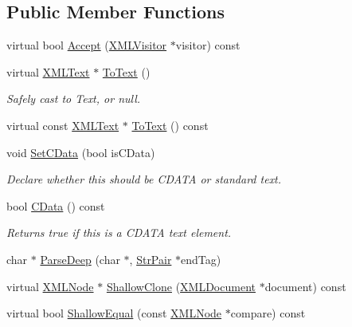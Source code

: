 \subsection*{Public Member Functions}
\begin{DoxyCompactItemize}
\item 
virtual bool \hyperlink{classtinyxml2_1_1_x_m_l_text_ae659d4fc7351a7df11c111cbe1ade46f}{Accept} (\hyperlink{classtinyxml2_1_1_x_m_l_visitor}{X\-M\-L\-Visitor} $\ast$visitor) const 
\item 
virtual \hyperlink{classtinyxml2_1_1_x_m_l_text}{X\-M\-L\-Text} $\ast$ \hyperlink{classtinyxml2_1_1_x_m_l_text_ab1213b4ddebe9b17ec7e7040e9f1caf7}{To\-Text} ()
\begin{DoxyCompactList}\small\item\em Safely cast to Text, or null. \end{DoxyCompactList}\item 
virtual const \hyperlink{classtinyxml2_1_1_x_m_l_text}{X\-M\-L\-Text} $\ast$ \hyperlink{classtinyxml2_1_1_x_m_l_text_a1e53cbc60968fe966790a65eaf87baaa}{To\-Text} () const 
\item 
void \hyperlink{classtinyxml2_1_1_x_m_l_text_ad080357d76ab7cc59d7651249949329d}{Set\-C\-Data} (bool is\-C\-Data)
\begin{DoxyCompactList}\small\item\em Declare whether this should be C\-D\-A\-T\-A or standard text. \end{DoxyCompactList}\item 
bool \hyperlink{classtinyxml2_1_1_x_m_l_text_a125574fe49da80efbae1349f20d02d41}{C\-Data} () const 
\begin{DoxyCompactList}\small\item\em Returns true if this is a C\-D\-A\-T\-A text element. \end{DoxyCompactList}\item 
char $\ast$ \hyperlink{classtinyxml2_1_1_x_m_l_text_ac18d9eec9f12b827b0d02b0847bf279e}{Parse\-Deep} (char $\ast$, \hyperlink{classtinyxml2_1_1_str_pair}{Str\-Pair} $\ast$end\-Tag)
\item 
virtual \hyperlink{classtinyxml2_1_1_x_m_l_node}{X\-M\-L\-Node} $\ast$ \hyperlink{classtinyxml2_1_1_x_m_l_text_af5115f8cc83de2947ed6a9d13e2f88c8}{Shallow\-Clone} (\hyperlink{classtinyxml2_1_1_x_m_l_document}{X\-M\-L\-Document} $\ast$document) const 
\item 
virtual bool \hyperlink{classtinyxml2_1_1_x_m_l_text_a1588aa5d23cb21eb31f36df0aaaa8d66}{Shallow\-Equal} (const \hyperlink{classtinyxml2_1_1_x_m_l_node}{X\-M\-L\-Node} $\ast$compare) const 
\end{DoxyCompactItemize}
